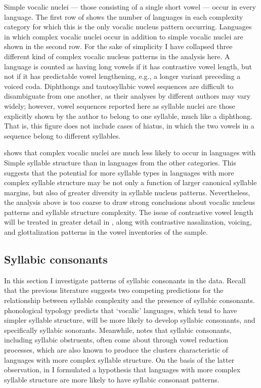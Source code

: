   Simple vocalic nuclei — those consisting of a single short vowel — occur in every language. The first row of  shows the number of languages in each complexity category for which this is the only vocalic nucleus pattern occurring. Languages in which complex vocalic nuclei occur in addition to simple vocalic nuclei are shown in the second row. For the sake of simplicity I have collapsed three different kind of complex vocalic nucleus patterns in the analysis here. A language is counted as having long vowels if it has contrastive vowel length, but not if it has predictable vowel lengthening, e.g., a longer variant preceding a voiced coda. Diphthongs and tautosyllabic vowel sequences are difficult to disambiguate from one another, as their analyses by different authors may vary widely; however, vowel sequences reported here as syllable nuclei are those explicitly shown by the author to belong to one syllable, much like a diphthong. That is, this figure does not include cases of hiatus, in which the two vowels in a sequence belong to different syllables.

   shows that complex vocalic nuclei are much less likely to occur in languages with Simple syllable structure than in languages from the other categories. This suggests that the potential for more syllable types in languages with more complex syllable structure may be not only a function of larger canonical syllable margins, but also of greater diversity in syllable nucleus patterns. Nevertheless, the analysis above is too coarse to draw strong conclusions about vocalic nucleus patterns and syllable structure complexity. The issue of contrastive vowel length will be treated in greater detail in , along with contrastive nasalization, voicing, and glottalization patterns in the vowel inventories of the sample.

\subsection{Syllabic consonants}\label{sec:3.3.5}

  In this section I investigate patterns of syllabic consonants in the data. Recall that the previous literature suggests two competing predictions for the relationship between syllable complexity and the presence of syllabic consonants.  phonological typology predicts that ‘vocalic’ languages, which tend to have simpler syllable structure, will be more likely to develop syllabic consonants, and specifically syllabic sonorants. Meanwhile, \citet{Bell1978a} notes that syllabic consonants, including syllabic obstruents, often come about through vowel reduction processes, which are also known to produce the clusters characteristic of languages with more complex syllable structure. On the basis of the latter observation, in  I formulated a hypothesis that languages with more complex syllable structure are more likely to have syllabic consonant patterns.

